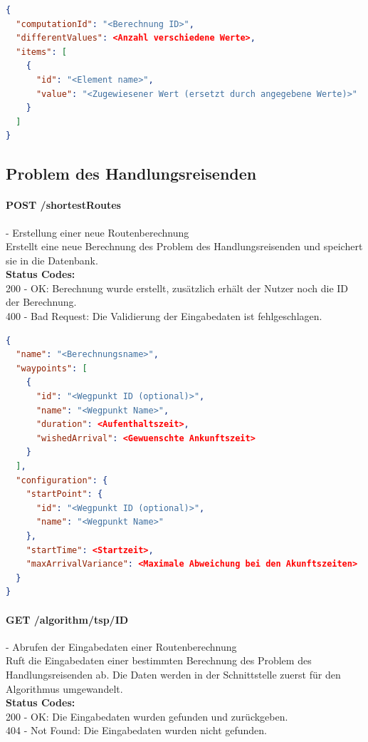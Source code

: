 \begin{lstlisting}[language=JSON, caption=Beispiel eines Endresultates für das Knotenfärbungsproblems, label=lst:solution_graphcoloring]  
{
  "computationId": "<Berechnung ID>",
  "differentValues": <Anzahl verschiedene Werte>,
  "items": [
    {
      "id": "<Element name>",
      "value": "<Zugewiesener Wert (ersetzt durch angegebene Werte)>"
    }
  ]
}
\end{lstlisting}

%
%
%
%

\subsection{Problem des Handlungsreisenden}

\paragraph{POST /shortestRoutes} - Erstellung einer neue Routenberechnung\mbox{}\\
Erstellt eine neue Berechnung des Problem des Handlungsreisenden und speichert sie in die Datenbank.\\
\textbf{Status Codes:}\\
200 - OK: Berechnung wurde erstellt, zusätzlich erhält der Nutzer noch die ID der Berechnung.\\
400 - Bad Request: Die Validierung der Eingabedaten ist fehlgeschlagen.\\

\begin{lstlisting}[language=JSON, caption=Beispiel einer Eingabe für das Problem des Handlungsreisenden, label=lst:input_tsp]  
{
  "name": "<Berechnungsname>",
  "waypoints": [
    {
      "id": "<Wegpunkt ID (optional)>",
      "name": "<Wegpunkt Name>",
      "duration": <Aufenthaltszeit>,
      "wishedArrival": <Gewuenschte Ankunftszeit>
    }
  ],
  "configuration": {
    "startPoint": {
      "id": "<Wegpunkt ID (optional)>",
      "name": "<Wegpunkt Name>"
    },
    "startTime": <Startzeit>,
    "maxArrivalVariance": <Maximale Abweichung bei den Akunftszeiten>
  }
}
\end{lstlisting}

\paragraph{GET /algorithm/tsp/{ID}} - Abrufen der Eingabedaten einer Routenberechnung\mbox{}\\
Ruft die Eingabedaten einer bestimmten Berechnung des Problem des Handlungsreisenden ab. Die Daten werden in der Schnittstelle zuerst für den Algorithmus umgewandelt.\\
\textbf{Status Codes:}\\
200 - OK: Die Eingabedaten wurden gefunden und zurückgeben.\\
404 - Not Found: Die Eingabedaten wurden nicht gefunden.\\

